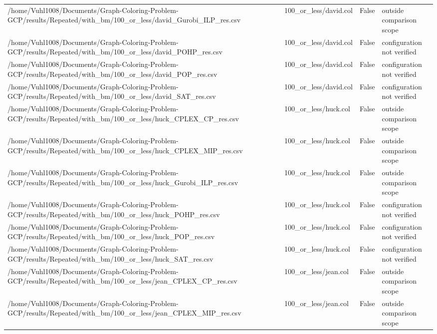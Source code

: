 \begin{table}[htbp]
\begin{tabular}{llll}
/home/Vuhl1008/Documents/Graph-Coloring-Problem-GCP/results/Repeated/with\_bm/100\_or\_less/david\_Gurobi\_ILP\_res.csv & 100\_or\_less/david.col & False & outside comparison scope \\
/home/Vuhl1008/Documents/Graph-Coloring-Problem-GCP/results/Repeated/with\_bm/100\_or\_less/david\_POHP\_res.csv & 100\_or\_less/david.col & False & configuration not verified \\
/home/Vuhl1008/Documents/Graph-Coloring-Problem-GCP/results/Repeated/with\_bm/100\_or\_less/david\_POP\_res.csv & 100\_or\_less/david.col & False & configuration not verified \\
/home/Vuhl1008/Documents/Graph-Coloring-Problem-GCP/results/Repeated/with\_bm/100\_or\_less/david\_SAT\_res.csv & 100\_or\_less/david.col & False & configuration not verified \\
/home/Vuhl1008/Documents/Graph-Coloring-Problem-GCP/results/Repeated/with\_bm/100\_or\_less/huck\_CPLEX\_CP\_res.csv & 100\_or\_less/huck.col & False & outside comparison scope \\
/home/Vuhl1008/Documents/Graph-Coloring-Problem-GCP/results/Repeated/with\_bm/100\_or\_less/huck\_CPLEX\_MIP\_res.csv & 100\_or\_less/huck.col & False & outside comparison scope \\
/home/Vuhl1008/Documents/Graph-Coloring-Problem-GCP/results/Repeated/with\_bm/100\_or\_less/huck\_Gurobi\_ILP\_res.csv & 100\_or\_less/huck.col & False & outside comparison scope \\
/home/Vuhl1008/Documents/Graph-Coloring-Problem-GCP/results/Repeated/with\_bm/100\_or\_less/huck\_POHP\_res.csv & 100\_or\_less/huck.col & False & configuration not verified \\
/home/Vuhl1008/Documents/Graph-Coloring-Problem-GCP/results/Repeated/with\_bm/100\_or\_less/huck\_POP\_res.csv & 100\_or\_less/huck.col & False & configuration not verified \\
/home/Vuhl1008/Documents/Graph-Coloring-Problem-GCP/results/Repeated/with\_bm/100\_or\_less/huck\_SAT\_res.csv & 100\_or\_less/huck.col & False & configuration not verified \\
/home/Vuhl1008/Documents/Graph-Coloring-Problem-GCP/results/Repeated/with\_bm/100\_or\_less/jean\_CPLEX\_CP\_res.csv & 100\_or\_less/jean.col & False & outside comparison scope \\
/home/Vuhl1008/Documents/Graph-Coloring-Problem-GCP/results/Repeated/with\_bm/100\_or\_less/jean\_CPLEX\_MIP\_res.csv & 100\_or\_less/jean.col & False & outside comparison scope \\

\end{tabular}
\end{table}
